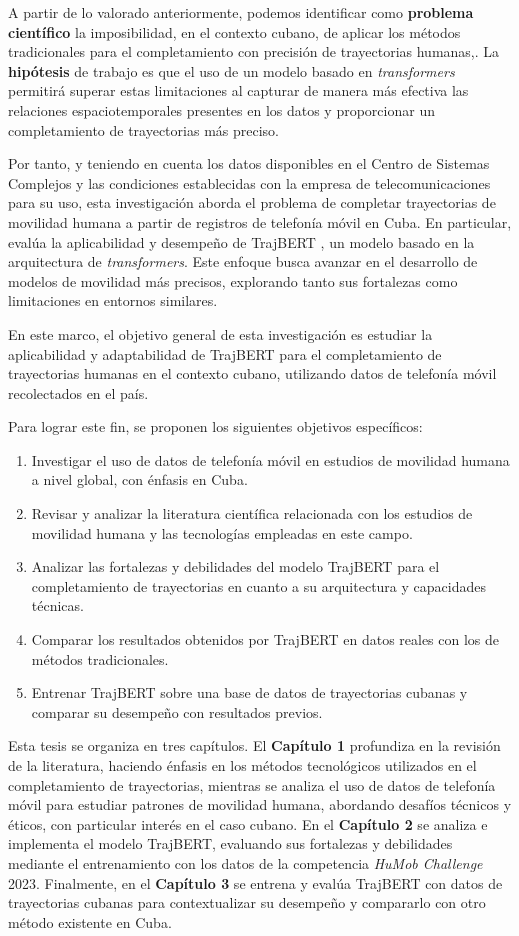 A partir de lo valorado anteriormente, podemos identificar como \textbf{problema científico} la imposibilidad, en el contexto cubano, de aplicar los métodos tradicionales para el completamiento con precisión de trayectorias humanas,. La \textbf{hipótesis} de trabajo es que el uso de un modelo basado en \textit{transformers} permitirá superar estas limitaciones al capturar de manera más efectiva las relaciones espaciotemporales presentes en los datos y proporcionar un completamiento de trayectorias más preciso.

Por tanto, y teniendo en cuenta los datos disponibles en el Centro de Sistemas Complejos y las condiciones establecidas con la empresa de telecomunicaciones para su uso, esta investigación aborda el problema de completar trayectorias de movilidad humana a partir de registros de telefonía móvil en Cuba. En particular, evalúa la aplicabilidad y desempeño de TrajBERT \cite{si2023trajbert}, un modelo basado en la arquitectura de \textit{transformers}. Este enfoque busca avanzar en el desarrollo de modelos de movilidad más precisos, explorando tanto sus fortalezas como limitaciones en entornos similares.

En este marco, el objetivo general de esta investigación es estudiar la aplicabilidad y adaptabilidad de TrajBERT para el completamiento de trayectorias humanas en el contexto cubano, utilizando datos de telefonía móvil recolectados en el país.

Para lograr este fin, se proponen los siguientes objetivos específicos:

\begin{enumerate} 
    \item Investigar el uso de datos de telefonía móvil en estudios de movilidad humana a nivel global, con énfasis en Cuba. 
    \item Revisar y analizar la literatura científica relacionada con los estudios de movilidad humana y las tecnologías empleadas en este campo. 
    \item Analizar las fortalezas y debilidades del modelo TrajBERT para el completamiento de trayectorias en cuanto a su arquitectura y capacidades técnicas. 
    \item Comparar los resultados obtenidos por TrajBERT en datos reales con los de métodos tradicionales. 
    \item Entrenar TrajBERT sobre una base de datos de trayectorias cubanas y comparar su desempeño con resultados previos.
\end{enumerate}

Esta tesis se organiza en tres capítulos. El \textbf{Capítulo 1} profundiza en la revisión de la literatura, haciendo énfasis en los métodos tecnológicos utilizados en el completamiento de trayectorias, mientras se analiza el uso de datos de telefonía móvil para estudiar patrones de movilidad humana, abordando desafíos técnicos y éticos, con particular interés en el caso cubano. En el \textbf{Capítulo 2} se analiza e implementa el modelo TrajBERT, evaluando sus fortalezas y debilidades mediante el entrenamiento con los datos de la competencia \textit{HuMob Challenge} 2023. Finalmente, en el \textbf{Capítulo 3} se entrena y evalúa TrajBERT con datos de trayectorias cubanas para contextualizar su desempeño y compararlo con otro método existente en Cuba.
